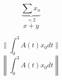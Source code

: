 \documentclass[]{article}
\begin{document}
\[\underset{= 2}{\underbrace{\sum x_{n}}}\]
\[ \overline{x+y}\] %

\[
    \left.\parallel{\int_{0}^{3}A(t)x_{0}dt} \right.\parallel
\] %
\[
    \left\| {\int_{0}^{3}A(t)x_{0}dt} \right\|
\] %
\end{document}

